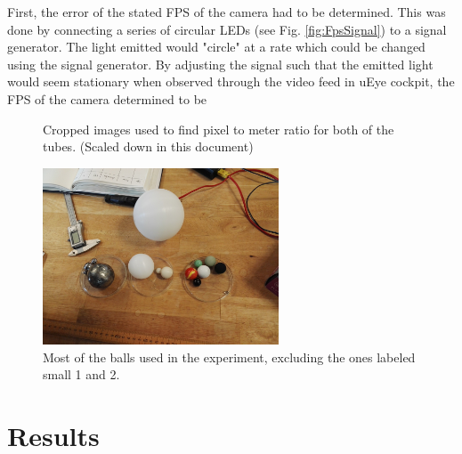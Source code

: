 \documentclass[11pt,a4paper]{article}
\begin{document}
\begin{multicols*}{2}
    First, the error of the stated FPS of the camera had to be determined. This was done by connecting a series of circular LEDs (see Fig. \ref{fig:FpsSignal}) to a signal generator. The light emitted would "circle" at a rate which could be changed using the signal generator. By adjusting the signal such that the emitted light would seem stationary when observed through the video feed in uEye cockpit, the FPS of the camera determined to be 
    

  \begin{figure}[h]
    \center

    \caption{Cropped images used to find pixel to meter ratio for both of the tubes. (Scaled down in this document)}
    \label{fig:scale1}
  \end{figure}

  \begin{figure}[H]
    \includegraphics[width=7cm]{scripts/figs/IMG_20180321_131204.jpg}
    \caption{Most of the balls used in the experiment, excluding the ones labeled small 1 and 2.}
  \end{figure}


\section{\label{sect:results}Results}
\end{multicols*}
\end{document}
